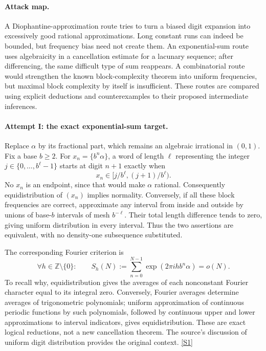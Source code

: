 \documentclass[11pt,a4paper]{article}
\newcommand{\Z}{\mathbb{Z}}
\newcommand{\sref}[2]{\hyperlink{source:#1:#2}{[S#2]}}
\numberwithin{equation}{section}
\begin{document}
\paragraph{Attack map.}
A Diophantine-approximation route tries to turn a biased digit expansion
into excessively good rational approximations.  Long constant runs
can indeed be bounded, but frequency bias need not create them.
An exponential-sum route uses algebraicity in a cancellation estimate
for a lacunary sequence; after differencing, the same difficult type
of sum reappears.  A combinatorial route would strengthen the known
block-complexity theorem into uniform frequencies, but maximal block
complexity by itself is insufficient.  These routes are compared using
explicit deductions and counterexamples to their proposed intermediate
inferences.

\paragraph{Attempt I: the exact exponential-sum target.}
Replace $\alpha$ by its fractional part, which remains an algebraic
irrational in $(0,1)$.  Fix a base $b\geq2$.  For
$x_n=\{b^n\alpha\}$, a word of length $\ell$ representing the integer
$j\in\{0,\ldots,b^\ell-1\}$ starts at digit $n+1$ exactly when
\[
 x_n\in[j/b^\ell,(j+1)/b^\ell).
\]
No $x_n$ is an endpoint, since that would make $\alpha$ rational.
Consequently equidistribution of $(x_n)$ implies normality.  Conversely,
if all these block frequencies are correct, approximate any interval
from inside and outside by unions of base-$b$ intervals of mesh
$b^{-\ell}$.  Their total length difference tends to zero, giving
uniform distribution in every interval.  Thus the two assertions are
equivalent, with no density-one subsequence substituted.

The corresponding Fourier criterion is
\begin{equation}\label{1259:weyl}
 \forall h\in\Z\setminus\{0\}:\qquad
 S_h(N):=\sum_{n=0}^{N-1}\exp(2\pi i h b^n\alpha)=o(N).
\end{equation}
To recall why, equidistribution gives the averages of each nonconstant
Fourier character equal to its integral zero.  Conversely, Fourier
averages determine averages of trigonometric polynomials; uniform
approximation of continuous periodic functions by such polynomials,
followed by continuous upper and lower approximations to interval
indicators, gives equidistribution.  These are exact logical
reductions, not a new cancellation theorem.  The source's discussion
of uniform digit distribution provides the original context.
\sref{1259}{1}
\end{document}
